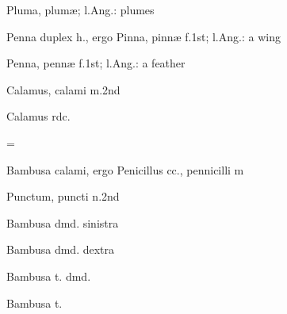  {\mktsStyleItalic{}Pluma\/}, plumæ; l.Ang.: plumes


 {\mktsStyleItalic{}Penna duplex h.\/}, ergo {\mktsStyleItalic{}Pinna\/}, pinnæ {\mktsStyleItalic{}f.1st\/}; l.Ang.: a wing


 {\mktsStyleItalic{}Penna\/}, pennæ {\mktsStyleItalic{}f.1st\/}; l.Ang.: a feather


 {\mktsStyleItalic{}Calamus\/}, calami {\mktsStyleItalic{}m.2nd\/}






 {\mktsStyleItalic{}Calamus rdc.\/}


={}


 {\mktsStyleItalic{}Bambusa calami\/}, ergo {\mktsStyleItalic{}Penicillus cc.\/}, pennicilli {\mktsStyleItalic{}m\/}


 {\mktsStyleItalic{}Punctum\/}, puncti {\mktsStyleItalic{}n.2nd\/}


 {\mktsStyleItalic{}Bambusa dmd. sinistra\/}


 {\mktsStyleItalic{}Bambusa dmd. dextra\/}


 {\mktsStyleItalic{}Bambusa t. dmd.\/}


 {\mktsStyleItalic{}Bambusa t.\/}


